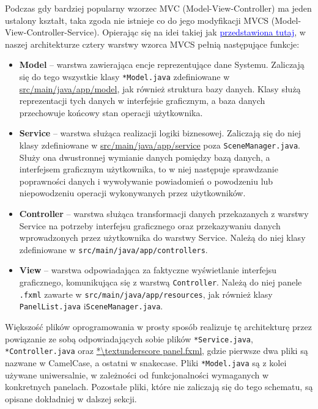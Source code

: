 \documentclass[a4paper,12pt]{article}
\begin{document}
Podczas gdy bardziej popularny wzorzec MVC (Model-View-Controller) ma jeden ustalony kształt, taka zgoda nie istnieje co do jego modyfikacji MVCS (Model-View-Controller-Service).
Opierając się na idei takiej jak \href{https://quantiphi.com/blog/an-introduction-to-mvcs-architecture/}{\textcolor{blue}{przedstawiona tutaj}}, w naszej architekturze cztery warstwy wzorca MVCS pełnią następujące funkcje:
\begin{itemize}
    \item \textbf{Model} -- warstwa zawierająca encje reprezentujące dane Systemu.
    Zaliczają się do tego wszystkie klasy \texttt{*Model.java} zdefiniowane w \url{src/main/java/app/model}, jak również struktura bazy danych.
    Klasy służą reprezentacji tych danych w interfejsie graficznym, a baza danych przechowuje końcowy stan operacji użytkownika.
    \item \textbf{Service} -- warstwa służąca realizacji logiki biznesowej.
    Zaliczają się do niej klasy zdefiniowane w \url{src/main/java/app/service} poza \texttt{SceneManager.java}.
    Służy ona dwustronnej wymianie danych pomiędzy bazą danych, a interfejsem graficznym użytkownika, to w niej następuje sprawdzanie poprawności danych i wywoływanie powiadomień o powodzeniu lub niepowodzeniu operacji wykonywanych przez użytkowników.
    \item \textbf{Controller} -- warstwa służąca transformacji danych przekazanych z warstwy Service na potrzeby interfejsu graficznego oraz przekazywaniu danych wprowadzonych przez użytkownika do warstwy Service.
    Należą do niej klasy zdefiniowane w \texttt{src/main/java/app/controllers}.
    \item \textbf{View} -- warstwa odpowiadająca za faktyczne wyświetlanie interfejsu graficznego, komunikująca się z warstwą \texttt{Controller}.
    Należą do niej panele \texttt{.fxml} zawarte w \texttt{src/main/java/app/resources}, jak również klasy \texttt{PanelList.java} i\linebreak\texttt{SceneManager.java}.
\end{itemize}

Większość plików oprogramowania w prosty sposób realizuje tę architekturę przez powiązanie ze sobą odpowiadających sobie plików \texttt{*Service.java}, \texttt{*Controller.java} oraz \url{*\textunderscore panel.fxml}, gdzie pierwsze dwa pliki są nazwane w CamelCase, a ostatni w snake\textunderscore{}case.
Pliki \texttt{*Model.java} są z kolei używane uniwersalnie, w zależności od funkcjonalności wymaganych w konkretnych panelach.
Pozostałe pliki, które nie zaliczają się do tego schematu, są opisane dokładniej w dalszej sekcji.
\end{document}
